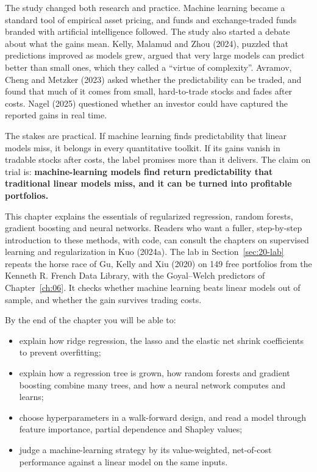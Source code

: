 The study changed both research and practice. Machine learning became a standard tool of empirical asset pricing, and funds and exchange-traded funds branded with artificial intelligence followed. The study also started a debate about what the gains mean. Kelly, Malamud and Zhou (2024), puzzled that predictions improved as models grew, argued that very large models can predict better than small ones, which they called a ``virtue of complexity''. Avramov, Cheng and Metzker (2023) asked whether the predictability can be traded, and found that much of it comes from small, hard-to-trade stocks and fades after costs. Nagel (2025) questioned whether an investor could have captured the reported gains in real time.

The stakes are practical. If machine learning finds predictability that linear models miss, it belongs in every quantitative toolkit. If its gains vanish in tradable stocks after costs, the label promises more than it delivers. The claim on trial is: \textbf{machine-learning models find return predictability that traditional linear models miss, and it can be turned into profitable portfolios.}

This chapter explains the essentials of regularized regression, random forests, gradient boosting and neural networks. Readers who want a fuller, step-by-step introduction to these methods, with code, can consult the chapters on supervised learning and regularization in Kuo (2024a). The lab in Section~\ref{sec:20-lab} repeats the horse race of Gu, Kelly and Xiu (2020) on 149 free portfolios from the Kenneth R. French Data Library, with the Goyal--Welch predictors of Chapter~\ref{ch:06}. It checks whether machine learning beats linear models out of sample, and whether the gain survives trading costs.

By the end of the chapter you will be able to:

\begin{itemize}
  \item explain how ridge regression, the lasso and the elastic net shrink coefficients to prevent overfitting;
  \item explain how a regression tree is grown, how random forests and gradient boosting combine many trees, and how a neural network computes and learns;
  \item choose hyperparameters in a walk-forward design, and read a model through feature importance, partial dependence and Shapley values;
  \item judge a machine-learning strategy by its value-weighted, net-of-cost performance against a linear model on the same inputs.
\end{itemize}

